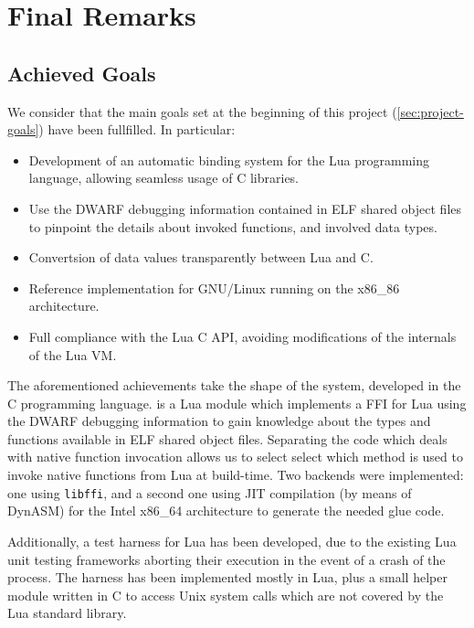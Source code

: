 \cleardoublepage

\chapter{Final Remarks}

\section{Achieved Goals}

We consider that the main goals set at the beginning of this project
(\autoref{sec:project-goals}) have been fullfilled. In particular:

\begin{itemize}

	\item Development of an automatic binding system for the Lua programming
	language, allowing seamless usage of C libraries.

	\item Use the DWARF debugging information contained in ELF shared object
	files to pinpoint the details about invoked functions, and involved data
	types.

	\item Convertsion of data values transparently between Lua and C.

	\item Reference implementation for GNU/Linux running on the
	x86\_86 architecture.

	\item Full compliance with the Lua C API, avoiding modifications of the
		internals of the Lua VM.

\end{itemize}

The aforementioned achievements take the shape of the \Eol* system, developed
in the C programming language. \Eol* is a Lua module which implements a FFI
for Lua using the DWARF debugging information to gain knowledge about the
types and functions available in ELF shared object files. Separating the code
which deals with native function invocation allows us to select select which
method is used to invoke native functions from Lua at build-time. Two backends
were implemented: one using \verb|libffi|, and a second one using JIT
compilation (by means of DynASM) for the Intel x86\_64 architecture to
generate the needed glue code.

Additionally, a test harness for Lua has been developed, due to the existing
Lua unit testing frameworks aborting their execution in the event of a crash
of the process. The harness has been implemented mostly in Lua, plus a small
helper module written in C to access Unix system calls which are not covered
by the Lua standard library.

